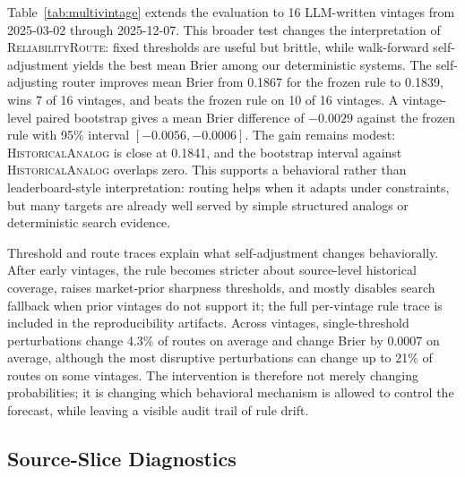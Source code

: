 \documentclass{article}
\newcommand{\rel}{\textsc{ReliabilityRoute}}
\newcommand{\hist}{\textsc{HistoricalAnalog}}
\begin{document}
Table~\ref{tab:multivintage} extends the evaluation to 16 LLM-written vintages from 2025-03-02 through 2025-12-07. This broader test changes the interpretation of \rel{}: fixed thresholds are useful but brittle, while walk-forward self-adjustment yields the best mean Brier among our deterministic systems. The self-adjusting router improves mean Brier from 0.1867 for the frozen rule to 0.1839, wins 7 of 16 vintages, and beats the frozen rule on 10 of 16 vintages. A vintage-level paired bootstrap gives a mean Brier difference of $-0.0029$ against the frozen rule with 95\% interval $[-0.0056,-0.0006]$. The gain remains modest: \hist{} is close at 0.1841, and the bootstrap interval against \hist{} overlaps zero. This supports a behavioral rather than leaderboard-style interpretation: routing helps when it adapts under constraints, but many targets are already well served by simple structured analogs or deterministic search evidence.

Threshold and route traces explain what self-adjustment changes behaviorally. After early vintages, the rule becomes stricter about source-level historical coverage, raises market-prior sharpness thresholds, and mostly disables search fallback when prior vintages do not support it; the full per-vintage rule trace is included in the reproducibility artifacts. Across vintages, single-threshold perturbations change 4.3\% of routes on average and change Brier by 0.0007 on average, although the most disruptive perturbations can change up to 21\% of routes on some vintages. The intervention is therefore not merely changing probabilities; it is changing which behavioral mechanism is allowed to control the forecast, while leaving a visible audit trail of rule drift.

\subsection{Source-Slice Diagnostics}
\end{document}
